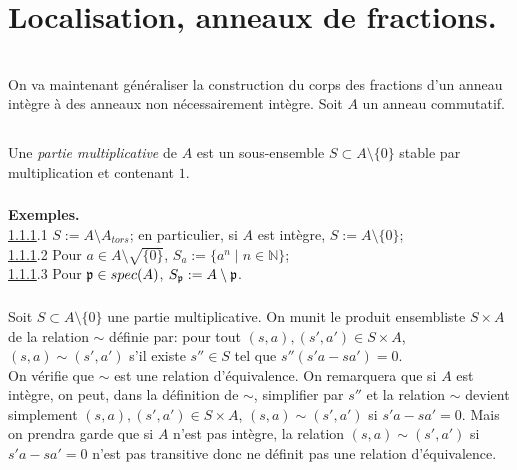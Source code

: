 \documentclass[a4paper, 12pt]{amsart}
\newcommand{\N}{\mathbb{N}}
\begin{document}
 

 
\section{Localisation, anneaux de fractions.}\textit{}\\
 On va maintenant généraliser la construction du corps des fractions d'un anneau intègre à des anneaux non nécessairement intègre. Soit $A$ un anneau commutatif. 

\subsection{}Une \textit{partie multiplicative}   de $A$ est un sous-ensemble $S\subset A\setminus\lbrace 0\rbrace$ stable par multiplication et contenant $1$. \\

\subsubsection{}\label{LocEx1}\textbf{Exemples.}\\

\ref{LocEx1}.1 $S:=A\setminus A_{tors}$; en particulier, si $A$ est intègre, $S:=A\setminus\lbrace 0\rbrace$;\\

\ref{LocEx1}.2 Pour $a\in A\setminus \sqrt{\lbrace 0\rbrace}$, $S_a:=\lbrace a^n\;|\; n\in\N\rbrace$;\\

\ref{LocEx1}.3 Pour $\frak{p}\in spec(A)$, $S_{\frak{p}}:=A\setminus \frak{p}$.


\subsubsection{}\label{LocDef} Soit $S\subset A\setminus\lbrace 0\rbrace$ une partie multiplicative. On munit le produit ensembliste $S\times A$ de la relation $\sim $ définie par: pour tout $(s,a),(s',a')\in S\times A$, $(s,a)\sim (s',a')$ s'il existe $s''\in S$ tel que $s''(s'a-sa')=0$. \\

 On vérifie que $\sim$ est une relation d'équivalence. On remarquera que si $A$ est intègre, on peut, dans la définition de $\sim$, simplifier par $s''$ et la relation $\sim$ devient simplement $(s,a),(s',a')\in S\times A$, $(s,a)\sim (s',a')$ si $s'a-sa'=0$.  Mais on prendra garde que si $A$ n'est pas intègre,  la relation $(s,a)\sim (s',a')$ si $s'a-sa'=0$ n'est pas transitive donc ne définit pas une relation d'équivalence.\\
\end{document}
